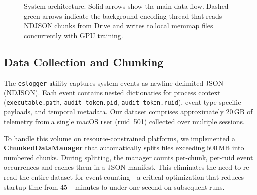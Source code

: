 \documentclass[letterpaper,twocolumn,10pt]{article}
\begin{document}
\begin{figure}[t]
\caption{System architecture. Solid arrows show the main data flow.
Dashed green arrows indicate the background encoding thread that
reads NDJSON chunks from Drive and writes to local memmap files
concurrently with GPU training.}
\label{fig:architecture}
\end{figure}

\subsection{Data Collection and Chunking}

The \texttt{eslogger} utility captures system events as
newline-delimited JSON (NDJSON). Each event contains nested
dictionaries for process context (\texttt{executable.path},
\texttt{audit\_token.pid}, \texttt{audit\_token.ruid}), event-type
specific payloads, and temporal metadata. Our dataset comprises
approximately 20\,GB of telemetry from a single macOS user
(ruid~501) collected over multiple sessions.

To handle this volume on resource-constrained platforms, we
implemented a \textbf{ChunkedDataManager} that automatically splits
files exceeding 500\,MB into numbered chunks. During splitting, the
manager counts per-chunk, per-ruid event occurrences and caches
them in a JSON manifest. This eliminates the need to re-read the
entire dataset for event counting---a critical optimization that
reduces startup time from 45+ minutes to under one second on
subsequent runs.
\end{document}
